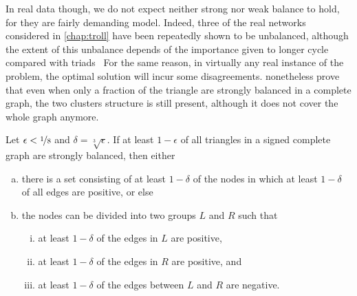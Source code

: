 In real data though, we do not expect neither strong nor weak balance to hold, for they are fairly
demanding model. Indeed, three of the real networks considered in \autoref{chap:troll} have been
repeatedly shown to be unbalanced, although the extent of this unbalance depends of the importance
given to longer cycle compared with triads~\autocites{Facchetti2011isingmodel}{measureUnbalance14}%
{measureUnbalance17} For the same reason, in virtually any real instance of the \pcc{} problem, the%
optimal solution will incur some disagreements. \Textcite[Section 5.5]{BookKleinberg2010}
nonetheless prove that even when only a fraction of the triangle are strongly balanced in a complete
graph, the two clusters structure is still present, although it does not cover the whole graph
anymore.

\begin{theorem}
  Let $\epsilon < \nicefrac{1}{8}$ and $\delta = \sqrt[3]\epsilon$. If at least $1-\epsilon$ of all
  triangles in a signed complete graph are strongly balanced, then either
  \begin{enumerate}[(a),nosep]
    \item there is a set consisting of at least $1-\delta$ of the nodes in which at least $1-\delta$
      of all edges are positive, or else
    \item the nodes can be divided into two groups $L$ and $R$ such that
      \begin{enumerate}[(i),nosep]
	\item at least $1-\delta$ of the edges in $L$ are positive,
	\item at least $1-\delta$ of the edges in $R$ are positive, and
	\item at least $1-\delta$ of the edges between $L$ and $R$ are negative.
      \end{enumerate}
  \end{enumerate}
\end{theorem}

